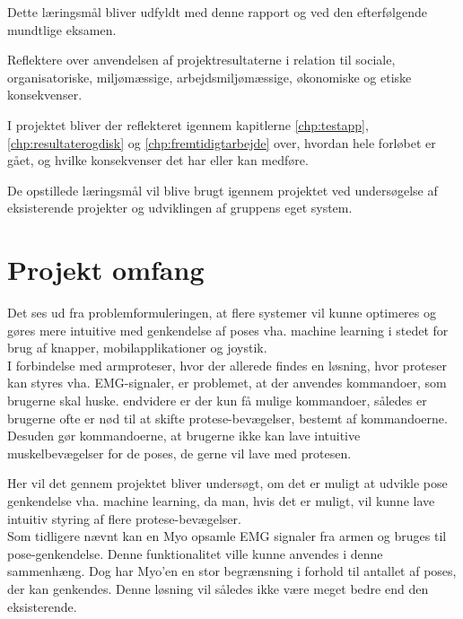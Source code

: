 \begin{myItemize}
	\begin{myItemize}
		\item Dette læringsmål bliver udfyldt med denne rapport og ved den efterfølgende mundtlige eksamen.
	\end{myItemize}
	\item Reflektere over anvendelsen af projektresultaterne i relation til sociale, organisatoriske, miljømæssige, arbejdsmiljømæssige, økonomiske og etiske konsekvenser.
	\begin{myItemize}
		\item I projektet bliver der reflekteret igennem kapitlerne \ref{chp:testapp}, \ref{chp:resultaterogdisk} og \ref{chp:fremtidigtarbejde} over, hvordan hele forløbet er gået, og hvilke konsekvenser det har eller kan medføre.
	\end{myItemize}
\end{myItemize}

De opstillede læringsmål vil blive brugt igennem projektet ved undersøgelse af eksisterende projekter og udviklingen af gruppens eget system.\\


\section{Projekt omfang}
Det ses ud fra problemformuleringen, at flere systemer vil kunne optimeres og gøres mere intuitive med genkendelse af poses vha. machine learning i stedet for brug af knapper, mobilapplikationer og joystik. \\

I forbindelse med armproteser, hvor der allerede findes en løsning, hvor proteser kan styres vha. EMG-signaler, er problemet, at der anvendes kommandoer, som brugerne skal huske. endvidere er der kun få mulige kommandoer, således er brugerne ofte er nød til at skifte protese-bevægelser, bestemt af kommandoerne. Desuden gør kommandoerne, at brugerne ikke kan lave intuitive muskelbevægelser for de poses, de gerne vil lave med protesen. 

Her vil det gennem projektet bliver undersøgt, om det er muligt at udvikle pose genkendelse vha. machine learning, da man, hvis det er muligt, vil kunne lave intuitiv styring af flere protese-bevægelser. \\
Som tidligere nævnt kan en Myo opsamle EMG signaler fra armen og bruges til pose-genkendelse. Denne funktionalitet ville kunne anvendes i denne sammenhæng. Dog har Myo'en en stor begrænsning i forhold til antallet af poses, der kan genkendes. Denne løsning vil således ikke være meget bedre end den eksisterende.\\

